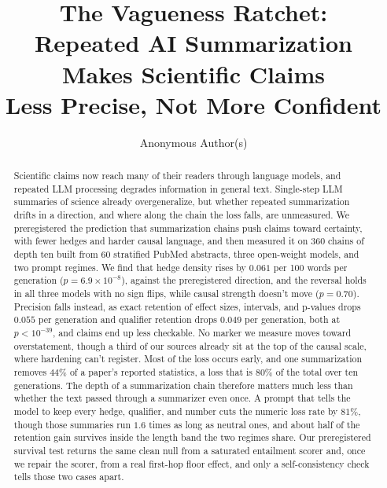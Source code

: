 \documentclass{article}
\title{The Vagueness Ratchet:\\Repeated AI Summarization Makes Scientific Claims\\Less Precise, Not More Confident}
\author{Anonymous Author(s)}
\begin{document}
\makeatletter
\renewcommand{\@noticestring}{Submitted to the AISciK Workshop (NeurIPS 2026). Do not distribute.}
\makeatother

\maketitle

\begin{abstract}
Scientific claims now reach many of their readers through language models, and repeated LLM processing degrades information in general text. Single-step LLM summaries of science already overgeneralize, but whether repeated summarization drifts in a direction, and where along the chain the loss falls, are unmeasured. We preregistered the prediction that summarization chains push claims toward certainty, with fewer hedges and harder causal language, and then measured it on 360 chains of depth ten built from 60 stratified PubMed abstracts, three open-weight models, and two prompt regimes. We find that hedge density rises by $0.061$ per 100 words per generation ($p = 6.9 \times 10^{-8}$), against the preregistered direction, and the reversal holds in all three models with no sign flips, while causal strength doesn't move ($p = 0.70$). Precision falls instead, as exact retention of effect sizes, intervals, and p-values drops $0.055$ per generation and qualifier retention drops $0.049$ per generation, both at $p < 10^{-39}$, and claims end up less checkable. No marker we measure moves toward overstatement, though a third of our sources already sit at the top of the causal scale, where hardening can't register. Most of the loss occurs early, and one summarization removes $44\%$ of a paper's reported statistics, a loss that is $80\%$ of the total over ten generations. The depth of a summarization chain therefore matters much less than whether the text passed through a summarizer even once. A prompt that tells the model to keep every hedge, qualifier, and number cuts the numeric loss rate by $81\%$, though those summaries run $1.6$ times as long as neutral ones, and about half of the retention gain survives inside the length band the two regimes share. Our preregistered survival test returns the same clean null from a saturated entailment scorer and, once we repair the scorer, from a real first-hop floor effect, and only a self-consistency check tells those two cases apart.
\end{abstract}
\end{document}
